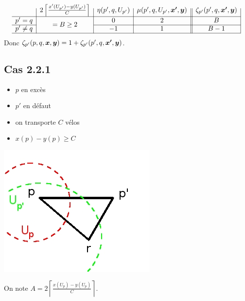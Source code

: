\documentclass[twoside,11pt,openany,a4paper]{rapport}
\begin{document}
\begin{gather*}
  \begin{array}{r|c|c|c||c|}
    & 2 \left\lceil \frac{x'(U_{p'})-y(U_{p'})}{C} \right\rceil
    & \eta(p',q,U_{p'})
    & \mu(p',q,U_{p'},\bs{x'},\bs{y})
    & \zeta_{p'}(p',q,\bs{x'},\bs{y})
    \\ \hline
    p' = q
    & \multirow{2}{*}{$= B \ge 2$}
    & 0
    & 2
    & B
    \\ \cline{1-1}\cline{3-5}
    p' \ne q
    &
    & -1
    & 1
    & B - 1
    \\ \hline
  \end{array}
\end{gather*}
Donc $\zeta_{p'}(p,q,\boldsymbol{x},\boldsymbol{y}) = 1 + \zeta_{p'}(p',q,\boldsymbol{x'},\boldsymbol{y})$.

\subsection*{Cas 2.2.1}

\begin{minipage}{0.5\linewidth}
\begin{itemize}
\item $p$ en excès
\item $p'$ en défaut
\item on transporte $C$ vélos
\item $x(p)-y(p) \ge C$
\end{itemize}
\end{minipage}
\begin{minipage}{0.5\linewidth}
\begin{center}
\includegraphics[scale=0.5]{graphe_triangulaire_221.jpg}
\end{center}
\end{minipage}

On note $A = 2 \left\lceil \frac{\displaystyle x(U_p)-y(U_p)}{\displaystyle C} \right\rceil$.
\end{document}
